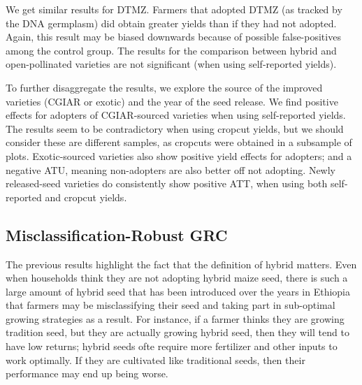 \documentclass[11pt]{article}
\begin{document}
We get similar results for DTMZ. Farmers that adopted DTMZ (as tracked by the DNA germplasm) did obtain greater yields than if they had not adopted. Again, this result may be biased downwards because of possible false-positives among the control group. The results for the comparison between hybrid and open-pollinated varieties are not significant (when using self-reported yields).



To further disaggregate the results, we explore the source of the improved varieties (CGIAR or exotic) and the year of the seed release. We find positive effects for adopters of CGIAR-sourced varieties when using self-reported yields. The results seem to be contradictory when using cropcut yields, but we should consider these are different samples, as cropcuts were obtained in a subsample of plots. Exotic-sourced varieties also show positive yield effects for adopters; and a negative ATU, meaning non-adopters are also better off not adopting. Newly released-seed varieties do consistently show positive ATT, when using both self-reported and cropcut yields. 



\subsection{Misclassification-Robust GRC}

The previous results highlight the fact that the definition of hybrid matters. Even when households think they are not adopting hybrid maize seed, there is such a large amount of hybrid seed that has been introduced over the years in Ethiopia that farmers may be misclassifying their seed and taking part in sub-optimal growing strategies as a result. For instance, if a farmer thinks they are growing tradition seed, but they are actually growing hybrid seed, then they will tend to have low returns; hybrid seeds ofte require more fertilizer and other inputs to work optimally. If they are cultivated like traditional seeds, then their performance may end up being worse.
\end{document}
